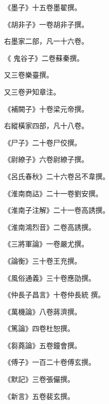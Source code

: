 \begin{pinyinscope}
 《墨子》十五卷墨翟撰。



 《胡非子》一卷胡非子撰。



 右墨家二部，凡一十六卷。



 《
 鬼谷子》二卷蘇秦撰。



 又三卷樂臺撰。



 又三卷尹知章注。



 《補闕子》十卷梁元帝撰。



 右縱橫家四部，凡十八卷。



 《尸子》二十卷尸佼撰。



 《尉繚子》六卷尉繚子撰。



 《呂氏春秋》二十六卷呂不韋撰。



 《淮南商詁》二十一卷劉安撰。



 《淮南子注解》二十一卷高誘撰。



 《淮南鴻烈音》二卷高誘撰。



 《三將軍論》一卷嚴尤撰。



 《論衡》三十卷王充撰。



 《風俗通義》三十卷應劭撰。



 《仲長子昌言》十卷仲長統
 撰。



 《萬機論》八卷蔣濟撰。



 《篤論》四卷杜恕撰。



 《芻蕘論》五卷鐘會撰。



 《傅子》一百二十卷傅玄撰。



 《默記》三卷張儼撰。



 《新言》五卷裴玄撰。




\end{pinyinscope}
